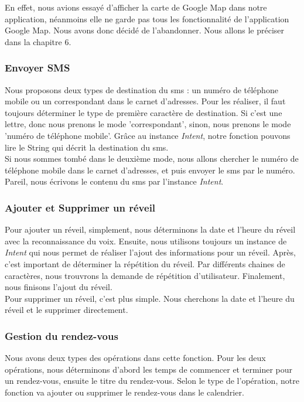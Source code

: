 \indent En effet, nous avions essayé d'afficher la carte de Google Map dans notre application, néanmoins elle ne garde pas tous les fonctionnalité de l'application Google Map. Nous avons donc décidé de l'abandonner. Nous allons le préciser dans la chapitre 6.\\

\subsubsection{Envoyer SMS}
\indent Nous proposons deux types de destination du sms : un numéro de téléphone mobile ou un correspondant dans le carnet d'adresses.  Pour les réaliser, il faut toujours déterminer le type de première caractère de destination. Si c'est une lettre, donc nous prenons le mode 'correspondant', sinon, nous prenons le mode 'numéro de téléphone mobile'. Grâce au instance \emph{Intent}, notre fonction pouvons lire le String qui décrit la destination du sms. \\

\indent Si nous sommes tombé dans le deuxième mode, nous allons chercher le numéro de téléphone mobile dans le carnet d'adresses, et puis envoyer le sms par le numéro.\\

\indent Pareil, nous écrivons le contenu du sms par l'instance \emph{Intent}.
	
\subsubsection{Ajouter et Supprimer un réveil}
\indent Pour ajouter un réveil, simplement, nous déterminons la date et l'heure du réveil avec la reconnaissance du voix. Ensuite, nous utilisons toujours un instance de \emph{Intent} qui nous permet de réaliser l'ajout des informations pour un réveil. Après, c'est important de déterminer la répétition du réveil. Par différents chaines de caractères, nous trouvrons la demande de répétition d'utilisateur. Finalement, nous finisons l'ajout du réveil.\\

\indent Pour supprimer un réveil, c'est plus simple. Nous cherchons la date et l'heure du réveil et le supprimer directement.\\

\subsubsection{Gestion du rendez-vous}
\indent Nous avons deux types des opérations dans cette fonction. Pour les deux opérations, nous déterminons d'abord les temps de commencer et terminer pour un rendez-vous, ensuite le titre du rendez-vous. Selon le type de l'opération, notre fonction va ajouter ou supprimer le rendez-vous dans le calendrier.\\

